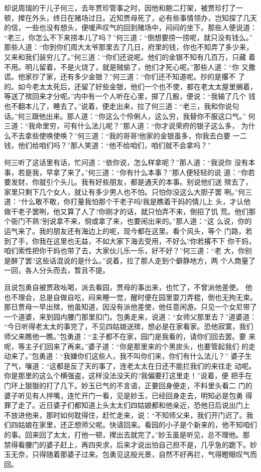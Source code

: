 却说周瑞的干儿子何三，去年贾珍管事之时，因他和鲍二打架，被贾珍打了一
顿，撵在外头，终日在赌场过日。近知贾母死了，必有些事情领办，岂知探了几天
的信，一些也没有想头，便嗳声叹气的回到赌场中，闷闷的坐下。那些人便说道：
“老三，你怎么不下来捞本儿了吗？”何三道：“倒想要捞一捞呢，就只没有钱么。”
那些人道：“你到你们周大太爷那里去了几日，府里的钱，你也不知弄了多少来，
又来和我们装穷儿了。”何三道：“你们还说呢。他们的金银不知有几百万，只藏
着不用。明儿留着，不是火烧了，就是贼偷了，他们才死心呢。”那些人道：“你
又撒谎。他家抄了家，还有多少金银？”何三道：“你们还不知道呢。抄的是撂不
了的。如今老太太死后，还留了好些金银，他们一个也不使，都在老太太屋里搁着，
等送了殡回来才分呢。”内中有一个人听在心里，掷了几骰，便说：“我输了几个
钱也不翻本儿了，睡去了。”说着，便走出来，拉了何三道：“老三，我和你说句
话。”何三跟他出来。那人道：“你这么个伶俐人，这么穷，我替你不服这口气。”
何三道：“我命里穷，可有什么法儿呢？”那人道：“你才说荣府的银子这么多，
为什么不去拿些使唤使唤？”何三道：“我的哥哥!他家的金银虽多，你我去白要
一二钱，他们给咱们吗？”那人笑道：“他不给咱们，咱们就不会拿吗？”

何三听了这话里有话，忙问道：“依你说，怎么样拿呢？”那人道：“我说你
没有本事，若是我，早拿了来了。”何三道：“你有什么本事？”那人便轻轻的说
道：“你若要发财，你就引个头儿。我有好些朋友，都是通天的本事。别说他们送
殡去了，家里只剩下几个女人，就让有多少男人也不怕。只怕你没这么大胆子罢
咧。”何三道：“什么敢不敢，你打量我怕那个干老子吗!我是瞧着干妈的情儿上
头，才认他做干老子罢咧，他又算了人了?你刚才的话，就只怕弄不来，倒招了饥
荒。他们那个衙门不熟?别说拿不来，倘或拿了来，也要闹出来的。”那人道：“这
么说，你的运气来了。我的朋友还有海边上的呢，现今都在这里。看个风头，等个
门路，若到了手，你我在这里也无益，不如大家下海去受用，不好么?你若撂不下
你干妈，咱们索性把你干妈也带了去，大家伙儿乐一乐，好不好？”何三道：“老
大，你别是醉了罢?这些话混说的是什么。”说着，拉了那人走到个僻静地方，两
个人商量了一回，各人分头而去，暂且不提。

且说包勇自被贾政吆喝，派去看园，贾母的事出来，也忙了，不曾派他差使。
他也不理会，总是自做自吃，闷来睡一觉，醒时便在园里耍刀弄棍，倒也无拘无束。
那日贾母一早出殡，他虽知道，因没有派他差使，他任意闲游。只见一个女尼带了
一个道婆，来到园内腰门那里扣门。包勇走来，说道：“女师父那里去？”道婆道：
“今日听得老太太的事完了，不见四姑娘送殡，想必是在家看家。恐他寂寞，我们
师父来瞧他一瞧。”包勇道：“主子都不在家，园门是我看的，请你们回去罢。要
来呢，等主子们回来了再来。”婆子道：“你是那里来的个黑炭头，也要管起我们
的走动来了。”包勇道：“我嫌你们这些人，我不叫你们来，你们有什么法儿？”
婆子生了气，嚷道：“这都是反了天的事了，连老太太在日还不能拦我们的来往走
动呢。你是那里的这么个横强盗，这样没法没天的?我偏要打这里走！”说着，便
把手在门环上狠狠的打了几下。妙玉已气的不言语，正要回身便走，不料里头看二
门的婆子听见有人拌嘴，连忙开门一看，见是妙玉，已经回身走去，明知必是包勇
得罪了走了。近日婆子们都知道上头太太们四姑娘都和他亲近，恐他日后说出门上
不放进他来，那时如何耽得住，赶忙走来，说：“不知师父来，我们开门迟了。我
们四姑娘在家里，还正想师父呢。快请回来。看园的小子是个新来的，他不知咱们
的事。回来回了太太，打他一顿，撵出去就完了。”妙玉虽是听见，总不理他。那
禁得看腰门的婆子赶上，再四央求，后来才说出怕自己担不是，几乎急的跪下。妙
玉无奈，只得随着那婆子过来。包勇见这般光景，自然不好再拦，气得瞪眼叹气而
回。

